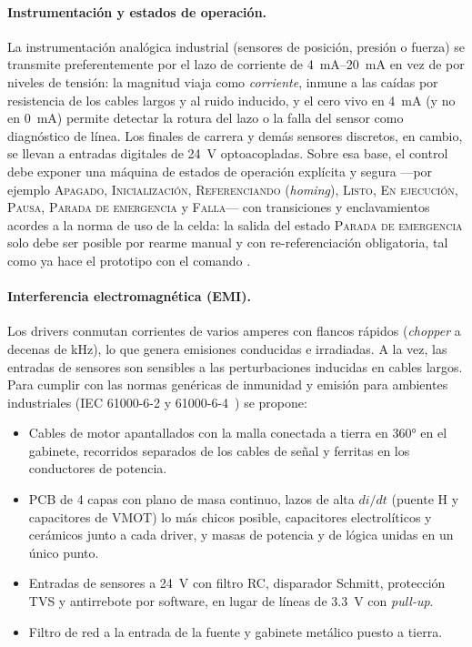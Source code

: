 \paragraph{Instrumentación y estados de operación.}
La instrumentación analógica industrial (sensores de posición, presión o fuerza) se transmite
preferentemente por el lazo de corriente de \SIrange{4}{20}{\milli\ampere} en vez de por niveles
de tensión: la magnitud viaja como \emph{corriente}, inmune a las caídas por resistencia de los
cables largos y al ruido inducido, y el cero vivo en \SI{4}{\milli\ampere} (y no en
\SI{0}{\milli\ampere}) permite detectar la rotura del lazo o la falla del sensor como diagnóstico
de línea. Los finales de carrera y demás sensores discretos, en cambio, se llevan a entradas
digitales de \SI{24}{\volt} optoacopladas. Sobre esa base, el control debe exponer una máquina de
estados de operación explícita y segura ---por ejemplo \textsc{Apagado}, \textsc{Inicialización},
\textsc{Referenciando} (\emph{homing}), \textsc{Listo}, \textsc{En ejecución}, \textsc{Pausa},
\textsc{Parada de emergencia} y \textsc{Falla}--- con transiciones y enclavamientos acordes a la
norma de uso de la celda: la salida del estado \textsc{Parada de emergencia} solo debe ser posible
por rearme manual y con re-referenciación obligatoria, tal como ya hace el prototipo con el
comando .

\paragraph{Interferencia electromagnética (EMI).}
Los drivers conmutan corrientes de varios amperes con flancos rápidos (\emph{chopper} a
decenas de kHz), lo que genera emisiones conducidas e irradiadas. A la vez, las entradas de
sensores son sensibles a las perturbaciones inducidas en cables largos. Para cumplir con las
normas genéricas de inmunidad y emisión para ambientes industriales (IEC 61000-6-2 y
61000-6-4~\cite{iec61000}) se propone:
\begin{itemize}
  \item Cables de motor apantallados con la malla conectada a tierra en \ang{360} en el
        gabinete, recorridos separados de los cables de señal y ferritas en los conductores de
        potencia.
  \item PCB de 4 capas con plano de masa continuo, lazos de alta $di/dt$ (puente H y
        capacitores de VMOT) lo más chicos posible, capacitores electrolíticos y cerámicos junto
        a cada driver, y masas de potencia y de lógica unidas en un único punto.
  \item Entradas de sensores a \SI{24}{\volt} con filtro RC, disparador Schmitt, protección TVS y
        antirrebote por software, en lugar de líneas de \SI{3,3}{\volt} con \emph{pull-up}.
  \item Filtro de red a la entrada de la fuente y gabinete metálico puesto a tierra.
\end{itemize}

